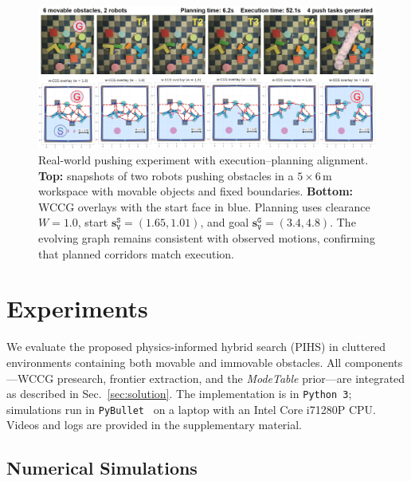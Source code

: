 \begin{figure}[t!]
  \centering
  \includegraphics[width=0.95\linewidth]{figures/hardware_wccg.png}
  \vspace{-4mm}
  \caption{Real-world pushing experiment with execution--planning alignment.
\textbf{Top:} snapshots of two robots pushing obstacles in a \(5{\times}6\,\mathrm{m}\) workspace
with movable objects and fixed boundaries. \textbf{Bottom:} WCCG overlays with the start face in
blue. Planning uses clearance \(W{=}1.0\), start \(\mathbf{s}^{\texttt{S}}_{\texttt{V}}{=}(1.65,1.01)\),
and goal \(\mathbf{s}^{\texttt{G}}_{\texttt{V}}{=}(3.4,4.8)\).
The evolving graph remains consistent with observed motions, confirming that planned corridors
match execution.}
  \vspace{-4mm}
  \label{fig:hardware}
\end{figure}
\section{Experiments}
\label{sec:experiments}
We evaluate the proposed physics-informed hybrid search (PIHS)
in cluttered environments containing both movable
and immovable obstacles. All components—WCCG presearch, frontier extraction,
and the \textit{ModeTable} prior—are integrated as described in Sec.~\ref{sec:solution}.
The implementation is in \texttt{Python~3};
simulations run in \texttt{PyBullet}~\cite{coumans2019} on a laptop with an Intel Core i7\textendash1280P CPU.
Videos and logs are provided in the supplementary material.



\subsection{Numerical Simulations}
\label{subsec:sim}

